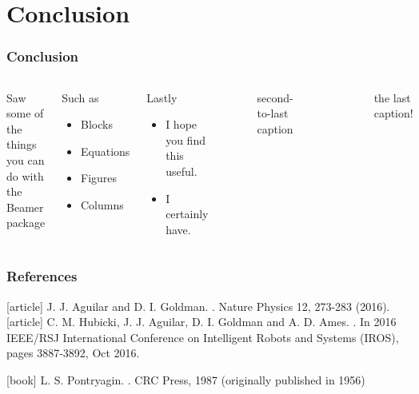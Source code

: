 \documentclass[aspectratio=169,9pt,xcolor=dvipsnames]{beamer}
\begin{document}
\section{Conclusion}
\begin{frame}
\frametitle{Conclusion}

\begin{columns}[c]

Saw some of the things you can do with the Beamer package
\begin{block}{Such as}
    \begin{itemize}
    \item Blocks
    \item Equations
    \item Figures
    \item Columns
    \end{itemize}
\end{block}
\begin{block}{Lastly}
    \begin{itemize}
    \item I hope you find this useful.
    \item I certainly have.
    \end{itemize}
\end{block}

\begin{figure}
\caption{second-to-last caption}
\end{figure}

\begin{figure}
\caption{the last caption!}
\end{figure}
\end{columns}

\end{frame}

\begin{frame}
\frametitle{References}
\begin{thebibliography}{99} %
[article]
    J. J. Aguilar and D. I. Goldman.
    .
    \newblock Nature Physics 12, 273-283 (2016).
[article]
    C. M. Hubicki, J. J. Aguilar, D. I. Goldman and A. D. Ames.
    .
    \newblock In 2016 IEEE/RSJ International Conference on Intelligent Robots and Systems (IROS), pages 3887-3892, Oct 2016.

[book]
    L. S. Pontryagin.
    .
    \newblock CRC Press, 1987 (originally published in 1956)
\end{thebibliography}
\end{frame}

\end{document}
